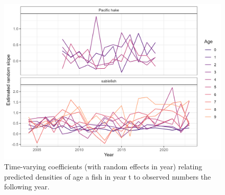 \documentclass[
]{article}
\begin{document}
\begin{figure}

{\centering \includegraphics[width=7in,height=\textheight]{plots/glm_coefficients_time.png}

}

\caption{\label{fig-glm-coefficients-time}Time-varying coefficients
(with random effects in year) relating predicted densities of age a fish
in year t to observed numbers the following year.}

\end{figure}
\end{document}
